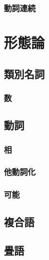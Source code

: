 \subsubsection{動詞連続}
\newpage

\section{形態論}
\subsection{類別名詞}
\subsubsection{数}
\subsection{動詞}
\subsubsection{相}
\subsubsection{他動詞化}
\subsubsection{可能}
\subsection{複合語}
\subsection{畳語}